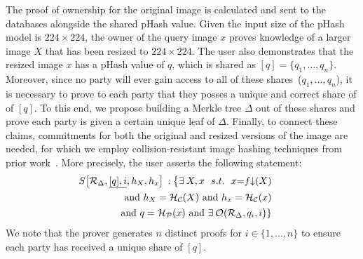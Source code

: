 \begin{compactitem}
    \item[]  The proof of ownership for the original image is calculated and sent to the databases alongside the shared pHash value. Given the input size of the pHash model is $224 \times 224$, the owner of the query image $x$ proves knowledge of a larger image $X$ that has been resized to $224 \times 224$. The user also demonstrates that the resized image $x$ has a pHash value of $q$, which is shared as $[q]=\{q_1,\dots,q_n\}$. Moreover, since no party will ever gain access to all of these shares~($q_1,\dots,q_n$), it is necessary to prove to each party that they posses a unique and correct share of of $[q]$. To this end, we propose building a Merkle tree $\Delta$ out of these shares and prove each party is given a certain unique leaf of $\Delta$. Finally, to connect these claims, commitments for both the original and resized versions of the image are needed, for which we employ collision-resistant image hashing techniques from prior work~\cite{vimz, veritas}. More precisely, the user asserts the following statement:
    \begin{equation}\label{eq:state-image}
        \begin{split}
        \hspace{-0.5cm}S\bigr[\mathcal{R}_\Delta, \underline{[q], i}, h_X, h_x \bigr] \: :\: \bigr\{ \exists \: X,  x\:\:\: s.t. \:\:\: x{=}f{\downarrow}(X) \\
         \mbox{ and }  h_X=\mathcal{H}_\mathcal{C}(X) \mbox{ and } h_x= \mathcal{H}_\mathcal{C}(x) \\
        \mbox{ and } q=\mathcal{H}_\mathcal{P}(x) \mbox{  and  } \exists\:\mathcal{O}(\mathcal{R}_\Delta, q_i, i\bigr)\}
        \end{split}
    \end{equation}
    We note that the prover generates $n$ distinct proofs for $i \in \{1, \dots, n\}$ to ensure each party has received a unique share of $[q]$.\\
    

\end{compactitem}
